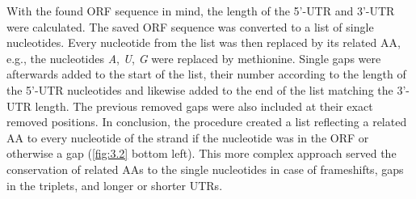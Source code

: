     With the found \gls{ORF} sequence in mind, the length of the 5'-\gls{UTR} and 3'-\gls{UTR} were calculated. The saved \gls{ORF} sequence was converted to a list of single nucleotides. Every nucleotide from the list was then replaced by its related \gls{AA}, e.g., the nucleotides \textit{A}, \textit{U}, \textit{G} were replaced by methionine. Single gaps were afterwards added to the start of the list, their number according to the length of the 5'-\gls{UTR} nucleotides and likewise added to the end of the list matching the 3'-\gls{UTR} length. The previous removed gaps were also included at their exact removed positions. In conclusion, the procedure created a list reflecting a related \gls{AA} to every nucleotide of the strand if the nucleotide was in the \gls{ORF} or otherwise a gap (\autoref{fig:3.2} bottom left). This more complex approach served the conservation of related \glspl{AA} to the single nucleotides in case of frameshifts, gaps in the triplets, and longer or shorter \glspl{UTR}.
    
